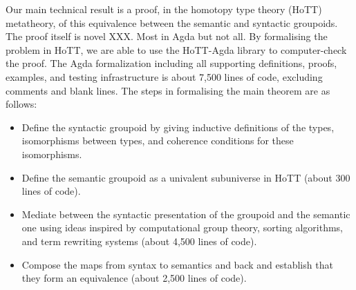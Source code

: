 Our main technical result is a proof, in the homotopy type theory (HoTT) metatheory, of this equivalence between the
semantic and syntactic groupoids. The proof itself is novel XXX. Most in Agda but not all. By formalising the problem in
HoTT, we are able to use the HoTT-Agda library to computer-check the proof. The Agda formalization including all
supporting definitions, proofs, examples, and testing infrastructure is about 7,500 lines of code, excluding comments
and blank lines. The steps in formalising the main theorem are as follows:
\begin{itemize}
\item Define the syntactic groupoid by giving inductive definitions of the types, isomorphisms between types, and
  coherence conditions for these isomorphisms.
\item Define the semantic groupoid as a univalent subuniverse in HoTT (about 300 lines of code).
\item Mediate between the syntactic presentation of the groupoid and the semantic one using ideas inspired by computational
  group theory, sorting algorithms, and term rewriting systems (about 4,500 lines of code).
\item Compose the maps from syntax to semantics and back and establish that they form an equivalence (about 2,500 lines
  of code).
\end{itemize}


